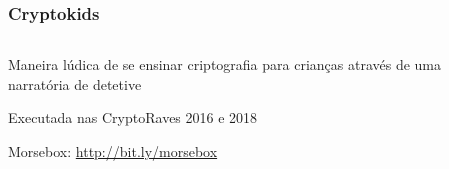 \documentclass{beamer}
\begin{document}
\begin{frame}
  \frametitle{Cryptokids}
  \begin{columns}
    \begin{column}{0.5\textwidth}
      Maneira lúdica de se ensinar criptografia para crianças através de uma narratória de detetive
      
      Executada nas CryptoRaves 2016 e 2018
      
      \vspace{\baselineskip}%
      Morsebox:
      \url{http://bit.ly/morsebox}
    \end{column}
    \begin{column}{0.5\textwidth}
    \end{column}
  \end{columns}
\end{frame}
\end{document}
